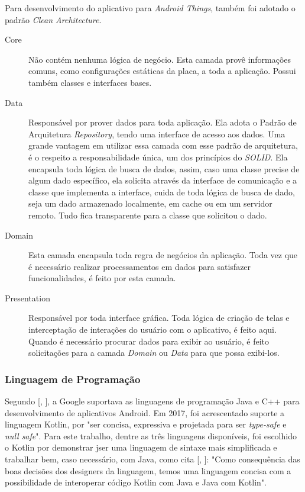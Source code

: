 \documentclass[
	12pt,				%
	oneside,			%
	a4paper,			%
	brazil				%
]{abntex2}
\newcommand{\citecustom}[1]{[\citeauthoronline{#1}, \citeyear{#1}]}
\begin{document}
{Para desenvolvimento do aplicativo para \textit{Android Things}, também foi adotado o padrão \textit{Clean Architecture}. 

\begin{description}

\item[Core] Não contém nenhuma lógica de negócio. Esta camada provê informações comuns, como configurações estáticas da placa, a toda a aplicação. Possui também classes e interfaces bases.

\item[Data] Responsável por prover dados para toda aplicação. Ela adota o Padrão de Arquitetura \textit{Repository}, tendo uma interface de acesso aos dados. Uma grande vantagem em utilizar essa camada com esse padrão de arquitetura, é o respeito a responsabilidade única, um dos princípios do \textit{SOLID}. Ela encapsula toda lógica de busca de dados, assim, caso uma classe precise de algum dado específico, ela solicita através da interface de comunicação e a classe que implementa a interface, cuida de toda lógica de busca de dado, seja um dado armazenado localmente, em cache ou em um servidor remoto. Tudo fica transparente para a classe que solicitou o dado.

\item[Domain] Esta camada encapsula toda regra de negócios da aplicação. Toda vez que é necessário realizar processamentos em dados para satisfazer funcionalidades, é feito por esta camada.

\item[Presentation] Responsável por toda interface gráfica. Toda lógica de criação de telas e interceptação de interações do usuário com o aplicativo, é feito aqui. Quando é necessário procurar dados para exibir ao usuário, é feito solicitações para a camada \textit{Domain} ou \textit{Data} para que possa exibi-los.
 
\end{description}

\subsubsection{Linguagem de Programação}

Segundo \citecustom{Avram2017}, a Google suportava as linguagens de programação Java e C++ para desenvolvimento de aplicativos Android. Em 2017, foi acrescentado suporte a linguagem Kotlin, por "ser concisa, expressiva e projetada para ser \textit{type-safe} e \textit{null safe}".
Para este trabalho, dentre as três linguagens disponíveis, foi escolhido o Kotlin por demonstrar jser uma linguagem de sintaxe mais simplificada e trabalhar bem, caso necessário, com Java, como cita \citecustom{Kewerson2017}: "Como consequência das boas decisões dos designers da linguagem, temos uma linguagem concisa com a possibilidade de interoperar código Kotlin com Java e Java com Kotlin".

}
\end{document}
